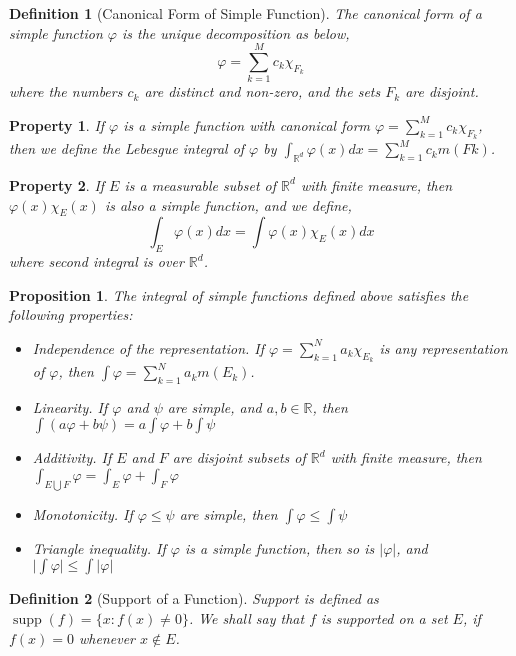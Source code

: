 \documentclass{report}
\theoremstyle{upthm}
\newtheorem{defn}{Definition}
\newtheorem{prop}{Proposition}
\newtheorem{property}{Property}
\newcommand{\reals}{\mathbb{R}}
\newcommand{\set}[1]{\big\lbrace #1 \big\rbrace}
\newcommand{\union}{\bigcup}
\newcommand{\vl}{\Big|}
\newcommand{\supp}{\mathop{\text{supp}}}
\begin{document}
\begin{defn}[Canonical Form of Simple Function]
	The canonical form of a simple function $\varphi$ is the unique decomposition as below,
	$$  \varphi = \sum_{k=1}^{M} c_k \chi_{F_k}  $$
	 where the numbers $c_k$ are distinct and non-zero, and the sets $F_k$ are disjoint.
\end{defn}
\begin{property}
	If $\varphi$ is a simple function with canonical form $  \varphi = \sum_{k=1}^{M} c_k \chi_{F_k}  $, then we define the Lebesgue integral of $\varphi$ by $\int_{\reals^d}^{} \varphi(x) dx = \sum_{k=1}^{M} c_k m(Fk)$.
\end{property}
\begin{property}
	If $E$ is a measurable subset of $\reals^d$ with finite measure, then $ \varphi(x) \chi_E(x)$
	is also a simple function, and we define,
	$$ \int_{E} \varphi(x) dx = \int \varphi(x) \chi_E(x) dx $$
	where second integral is over $\reals^d$.
\end{property}

\begin{prop}
	The integral of simple functions defined above satisfies the following properties:
	\begin{itemize}
		\item Independence of the representation. If $ \varphi = \sum_{k=1}^{N} a_k \chi_{E_k}$ is any representation of $\varphi$, then $ \int \varphi = \sum_{k=1}^{N} a_k m(E_k) $.
		\item Linearity. If $\varphi$ and $\psi$ are simple, and $a, b \in \reals$, then $\int (a \varphi + b \psi) = a \int \varphi + b \int \psi $
		\item Additivity. If $E$ and $F$ are disjoint subsets of $\reals^d$ with finite measure, then $ \int_{E \union F} \varphi = \int_{E} \varphi + \int_{F} \varphi $
		\item Monotonicity. If $\varphi  \leq \psi$ are simple, then $ \int \varphi \leq \int \psi$
		\item Triangle inequality. If $\varphi$ is a simple function, then so is $|\varphi|$, and $ \vl \int \varphi \vl \leq \int | \varphi |  $
	\end{itemize}
\end{prop}

\begin{defn}[Support of a Function]
	Support is defined as $\supp(f) = \set{x : f(x) \neq 0} $. We shall say that $f$ is supported on a set $E$, if $f(x) = 0$ whenever $x \notin E$.
\end{defn}
\end{document}
